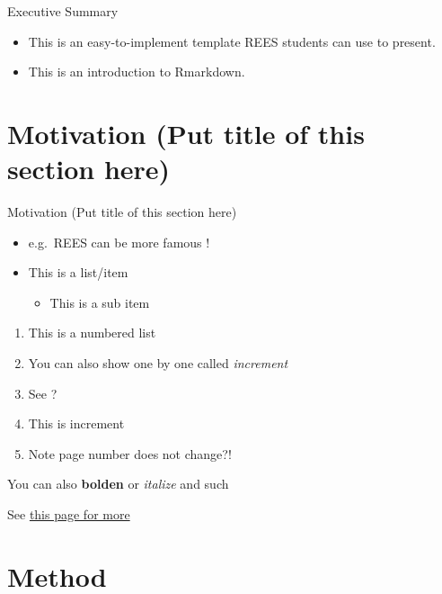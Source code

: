 \documentclass[
  9pt,
  ignorenonframetext,
  compress]{beamer}
\providecommand{\tightlist}{%
  \setlength{\itemsep}{0pt}\setlength{\parskip}{0pt}}
\begin{document}
\begin{frame}{Executive Summary}
\begin{itemize}
\item
  This is an easy-to-implement template REES students can use to
  present.
\item
  This is an introduction to Rmarkdown.
\end{itemize}
\end{frame}

\hypertarget{motivation-put-title-of-this-section-here}{%
\section{Motivation (Put title of this section
here)}\label{motivation-put-title-of-this-section-here}}

\begin{frame}{Motivation (Put title of this section here)}
\begin{itemize}
\item
  e.g.~REES can be more famous !
\item
  This is a list/item

  \begin{itemize}
  \tightlist
  \item
    This is a sub item
  \end{itemize}
\end{itemize}

\begin{enumerate}
\tightlist
\item
  This is a numbered list
\item
  You can also show one by one called \emph{increment}
\end{enumerate}

\begin{enumerate}[<+->]
\setcounter{enumi}{2}
\item
  See ?
\item
  This is increment
\item
  Note page number does not change?!
\end{enumerate}
\end{frame}

\begin{frame}
You can also \textbf{bolden} or \emph{italize} and such

See
\href{https://bookdown.org/yihui/rmarkdown/beamer-presentation.html}{this
page for more}
\end{frame}

\hypertarget{method}{%
\section{Method}\label{method}}
\end{document}
